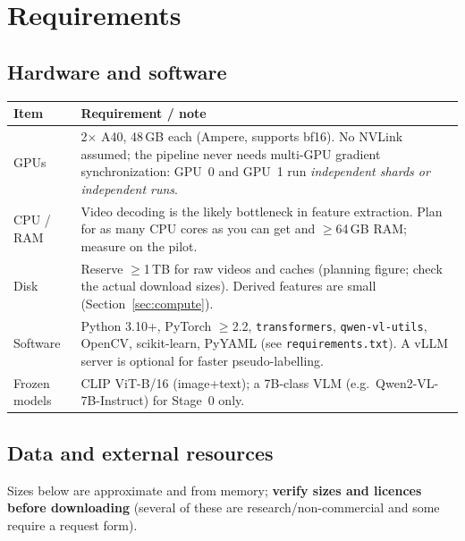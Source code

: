 \documentclass[11pt,a4paper]{article}
\newcommand{\code}[1]{\texttt{#1}}
\begin{document}
\section{Requirements}
\subsection{Hardware and software}
\begin{tabularx}{\linewidth}{@{}l Y@{}}
\toprule
Item & Requirement / note\\
\midrule
GPUs & 2$\times$ A40, 48\,GB each (Ampere, supports bf16). No NVLink assumed; the pipeline never needs multi-GPU gradient synchronization: GPU~0 and GPU~1 run \emph{independent shards or independent runs}.\\
CPU / RAM & Video decoding is the likely bottleneck in feature extraction. Plan for as many CPU cores as you can get and $\ge$64\,GB RAM; measure on the pilot.\\
Disk & Reserve $\ge$1\,TB for raw videos and caches (planning figure; check the actual download sizes). Derived features are small (Section~\ref{sec:compute}).\\
Software & Python 3.10+, PyTorch $\ge$2.2, \code{transformers}, \code{qwen-vl-utils}, OpenCV, scikit-learn, PyYAML (see \code{requirements.txt}). A vLLM server is optional for faster pseudo-labelling.\\
Frozen models & CLIP ViT-B/16 (image+text); a 7B-class VLM (e.g.\ Qwen2-VL-7B-Instruct) for Stage~0 only.\\
\bottomrule
\end{tabularx}

\subsection{Data and external resources}
\label{sec:data}
Sizes below are approximate and from memory; \textbf{verify sizes and licences before downloading} (several of these are research/non-commercial and some require a request form).
\end{document}
